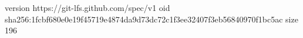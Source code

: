 version https://git-lfs.github.com/spec/v1
oid sha256:1fcbf680e0e19f45719e4874da9d73dc72c1f3ee32407f3eb56840970f1bc5ac
size 196

